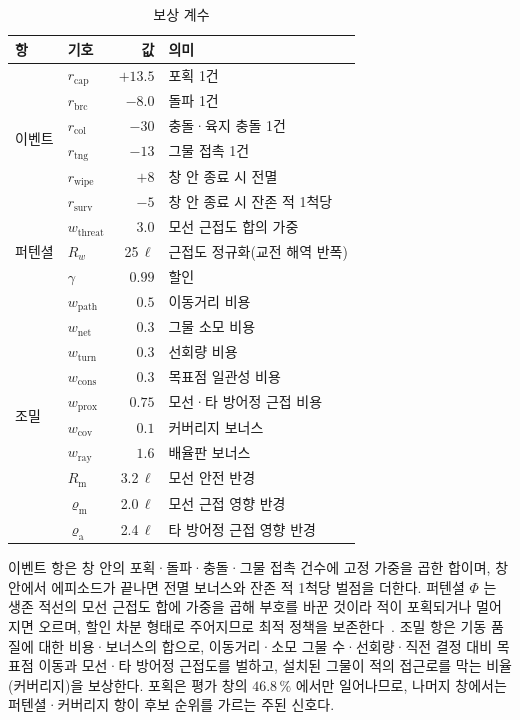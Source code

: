 \begin{table}[tp]
\centering
\caption{보상 계수}
\label{tab:reward_coef}
\footnotesize
\renewcommand{\arraystretch}{1.15}
\begin{tabular}{@{}llr@{\hspace{2mm}}l@{}}
\toprule
항 & 기호 & 값 & 의미 \\
\midrule
\multirow{6}{*}{이벤트}
 & $r_{\mathrm{cap}}$  & $+13.5$ & 포획 1건 \\
 & $r_{\mathrm{brc}}$  & $-8.0$  & 돌파 1건 \\
 & $r_{\mathrm{col}}$  & $-30$   & 충돌·육지 충돌 1건 \\
 & $r_{\mathrm{tng}}$  & $-13$   & 그물 접촉 1건 \\
 & $r_{\mathrm{wipe}}$ & $+8$    & 창 안 종료 시 전멸 \\
 & $r_{\mathrm{surv}}$ & $-5$    & 창 안 종료 시 잔존 적 1척당 \\
\midrule
\multirow{3}{*}{퍼텐셜}
 & $w_{\mathrm{threat}}$ & $3.0$  & 모선 근접도 합의 가중 \\
 & $R_w$                 & 25\,$\ell$ & 근접도 정규화(교전 해역 반폭) \\
 & $\gamma$              & $0.99$ & 할인 \\
\midrule
\multirow{10}{*}{조밀}
 & $w_{\mathrm{path}}$ & $0.5$  & 이동거리 비용 \\
 & $w_{\mathrm{net}}$  & $0.3$  & 그물 소모 비용 \\
 & $w_{\mathrm{turn}}$ & $0.3$  & 선회량 비용 \\
 & $w_{\mathrm{cons}}$ & $0.3$  & 목표점 일관성 비용 \\
 & $w_{\mathrm{prox}}$ & $0.75$ & 모선·타 방어정 근접 비용 \\
 & $w_{\mathrm{cov}}$  & $0.1$  & 커버리지 보너스 \\
 & $w_{\mathrm{ray}}$  & $1.6$  & 배율판 보너스 \\
 & $R_{\mathrm{m}}$      & 3.2\,$\ell$ & 모선 안전 반경 \\
 & $\varrho_{\mathrm{m}}$ & 2.0\,$\ell$ & 모선 근접 영향 반경 \\
 & $\varrho_{\mathrm{a}}$ & 2.4\,$\ell$ & 타 방어정 근접 영향 반경 \\
\bottomrule
\end{tabular}
\end{table}

이벤트 항은 창 안의 포획·돌파·충돌·그물 접촉 건수에 고정 가중을 곱한 합이며, 창 안에서
에피소드가 끝나면 전멸 보너스와 잔존 적 1척당 벌점을 더한다. 퍼텐셜 $\Phi$ 는 생존 적선의
모선 근접도 합에 가중을 곱해 부호를 바꾼 것이라 적이 포획되거나 멀어지면 오르며, 할인 차분 형태로 주어지므로 최적 정책을
보존한다~\citep{ng1999shaping}. 조밀 항은 기동 품질에 대한 비용·보너스의 합으로, 이동거리·소모
그물 수·선회량·직전 결정 대비 목표점 이동과 모선·타 방어정 근접도를 벌하고, 설치된 그물이 적의
접근로를 막는 비율(커버리지)을 보상한다. 포획은 평가 창의 $46.8\,\%$ 에서만 일어나므로,
나머지 창에서는 퍼텐셜·커버리지 항이 후보 순위를 가르는 주된 신호다.

